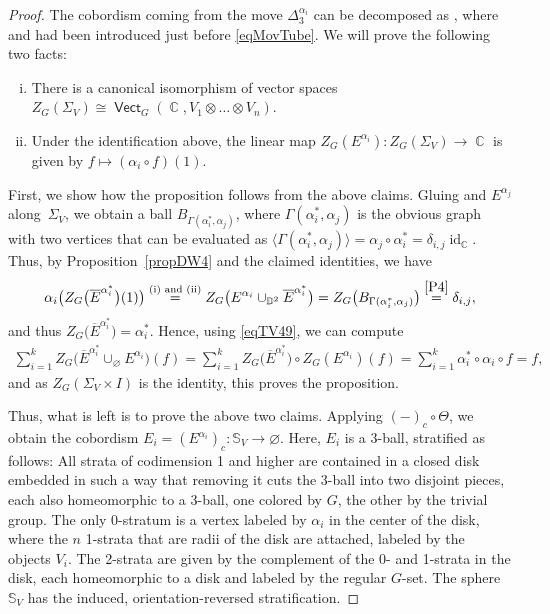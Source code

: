\documentclass[pdftex]{sigma}
\DeclareMathOperator{\id}{id}
\DeclareMathOperator{\vect}{\mathsf{Vect}}
\DeclareMathOperator{\C}{\mathbb{C}}
\numberwithin{equation}{section}
\theoremstyle{definition}
\begin{document}
\begin{proof}
 The cobordism coming from the move $\Delta_3^{\alpha_i}$ can be decomposed as , where~ and  had been introduced just before \eqref{eqMovTube}. We will prove the following two facts:
 \begin{enumerate}[(i)]\itemsep=0pt
 \item There is a canonical isomorphism of vector spaces $Z_G(\Sigma_V) \cong \vect_G (\C, V_1 \otimes \dots \otimes V_n )$.
 \item Under the identification above, the linear map $Z_G(E^{\alpha_i})\colon Z_G(\Sigma_V) \rightarrow \C$ is given by $f \mapsto (\alpha_i \circ f)(1)$.
 \end{enumerate}
 First, we show how the proposition follows from the above claims. Gluing  and $E^{\alpha_j}$ along~$\Sigma_V$, we obtain a ball $B_{\Gamma(\alpha_i^*, \alpha_j)}$, where $\Gamma(\alpha_i^*, \alpha_j)$ is the obvious graph with two vertices that can be evaluated as $\langle \Gamma(\alpha_i^*, \alpha_j)\rangle = \alpha_j \circ \alpha_i^* = \delta_{i,j}\id_{\C}$. Thus, by Proposition~\ref{propDW4} and the claimed identities, we have
 \begin{align*}
 \alpha_i\bigl(Z_G\bigl(\overline{E}^{\alpha_i^*}\bigr)(1)\bigr) \overset{\text{(i) and (ii)}}{=} Z_G\bigl(E^{\alpha_i} \cup_{\mathbb{D}^2} \overline{E}^{\alpha_i^*}\bigr) = Z_G\bigl(B_{\Gamma(\alpha_i^*, \alpha_j)}\bigr) \overset{\ref{P4}}{=} \delta_{i,j},
 \end{align*}
 and thus $Z_G\bigl(\overline{E}^{\alpha_i^*}\bigr) = \alpha_i^*$. Hence, using \eqref{eqTV49}, we can compute{\samepage
 \begin{align*}
 \sum_{i = 1}^k Z_G\bigl(\overline{E}^{\alpha_i^*} \cup_{\varnothing} E^{\alpha_i}\bigr)(f) = \sum_{i = 1}^kZ_G\bigl(\overline{E}^{\alpha_i^*}\bigr) \circ Z_G(E^{\alpha_i})(f) = \sum_{i = 1}^k \alpha_i^* \circ \alpha_i \circ f = f,
 \end{align*}
 and as $Z_G(\Sigma_V \times I)$ is the identity, this proves the proposition.}

 Thus, what is left is to prove the above two claims. Applying $(-)_c \circ \Theta$, we obtain the cobordism $E_i = (E^{\alpha_i})_c\colon \mathbb{S}_V \rightarrow \varnothing$. Here, $E_i$ is a 3-ball, stratified as follows: All strata of codimension 1 and higher are contained in a closed disk embedded in such a way that removing it cuts the 3-ball into two disjoint pieces, each also homeomorphic to a 3-ball, one colored by $G$, the other by the trivial group. The only 0-stratum is a vertex labeled by $\alpha_i$ in the center of the disk, where the $n$ 1-strata that are radii of the disk are attached, labeled by the objects $V_i$. The 2-strata are given by the complement of the 0- and 1-strata in the disk, each homeomorphic to a disk and labeled by the regular $G$-set. The sphere $\mathbb{S}_V$ has the induced, orientation-reversed stratification.


\end{proof}
\end{document}
